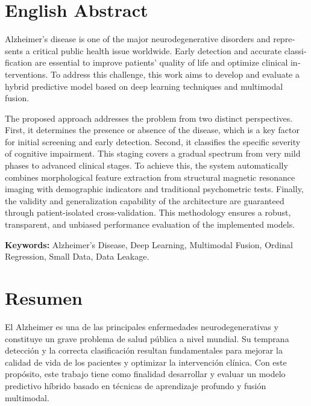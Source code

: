 \documentclass[12pt, oneside, english, spanish]{book}
\begin{document}
\chapter*{English Abstract}
\begin{otherlanguage}{english}
	Alzheimer's disease is one of the major neurodegenerative disorders	 and represents a critical public health issue worldwide. Early detection and accurate classification are essential to improve patients' quality of life and optimize clinical interventions. To address this challenge, this work aims to develop and evaluate a hybrid predictive model based on deep learning techniques and multimodal fusion.
	
	The proposed approach addresses the problem from two distinct perspectives. First, it determines the presence or absence of the disease, which is a key factor for initial screening and early detection. Second, it classifies the specific severity of cognitive impairment. This staging covers a gradual spectrum from very mild phases to advanced clinical stages. To achieve this, the system automatically combines morphological feature extraction from structural magnetic resonance imaging with demographic indicators and traditional psychometric tests. Finally, the validity and generalization capability of the architecture are guaranteed through patient-isolated cross-validation. This methodology ensures a robust, transparent, and unbiased performance evaluation of the implemented models.
	
	\vspace{0.5cm}
	\noindent \textbf{Keywords:} Alzheimer's Disease, Deep Learning, Multimodal Fusion, Ordinal Regression, Small Data, Data Leakage.
\end{otherlanguage}


\chapter*{Resumen}
El Alzheimer es una de las principales enfermedades neurodegenerativas y constituye un grave problema de salud pública a nivel mundial. Su temprana detección y la correcta clasificación resultan fundamentales para mejorar la calidad de vida de los pacientes y optimizar la intervención clínica. Con este propósito, este trabajo tiene como finalidad desarrollar y evaluar un modelo predictivo híbrido basado en técnicas de aprendizaje profundo y fusión multimodal. 
\end{document}
